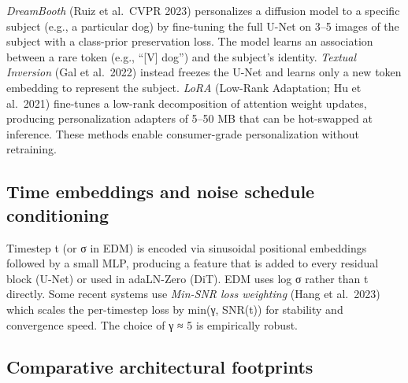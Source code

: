 \emph{DreamBooth} (Ruiz et al.~CVPR 2023) personalizes a diffusion model to a specific subject (e.g., a particular dog) by fine-tuning the full U-Net on 3--5 images of the subject with a class-prior preservation loss. The model learns an association between a rare token (e.g., ``{[}V{]} dog'') and the subject's identity. \emph{Textual Inversion} (Gal et al.~2022) instead freezes the U-Net and learns only a new token embedding to represent the subject. \emph{LoRA} (Low-Rank Adaptation; Hu et al.~2021) fine-tunes a low-rank decomposition of attention weight updates, producing personalization adapters of 5--50 MB that can be hot-swapped at inference. These methods enable consumer-grade personalization without retraining.

\subsection{Time embeddings and noise schedule conditioning}\label{time-embeddings-and-noise-schedule-conditioning}

Timestep t (or σ in EDM) is encoded via sinusoidal positional embeddings followed by a small MLP, producing a feature that is added to every residual block (U-Net) or used in adaLN-Zero (DiT). EDM uses log σ rather than t directly. Some recent systems use \emph{Min-SNR loss weighting} (Hang et al.~2023) which scales the per-timestep loss by min(γ, SNR(t)) for stability and convergence speed. The choice of γ ≈ 5 is empirically robust.

\subsection{Comparative architectural footprints}\label{comparative-architectural-footprints}

